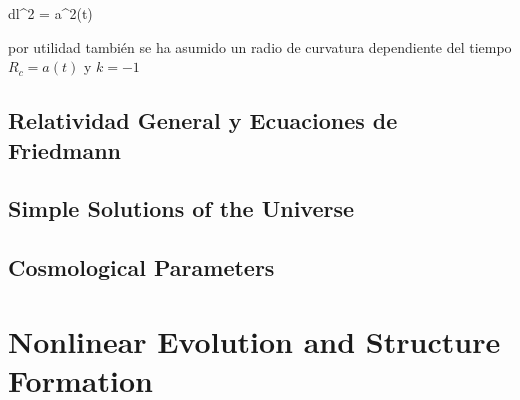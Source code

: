 { dl^2 = a^2(t)  }


por utilidad también se ha asumido un radio de curvatura dependiente del 
tiempo $R_c = a(t)$ y $k = -1$


	\subsection{Relatividad General y Ecuaciones de Friedmann}
	\label{subsec:GeneralRelativityAndFriedmannEquations}
	

	\subsection{Simple Solutions of the Universe}
	\label{subsec:SimpleSolutionsOfTheUniverse}


	\subsection{Cosmological Parameters}
	\label{subsec:CosmologicalParameters}






\section{Nonlinear Evolution and Structure Formation}
\label{sec:NonlinearEvolutionAndStructureFormation}





